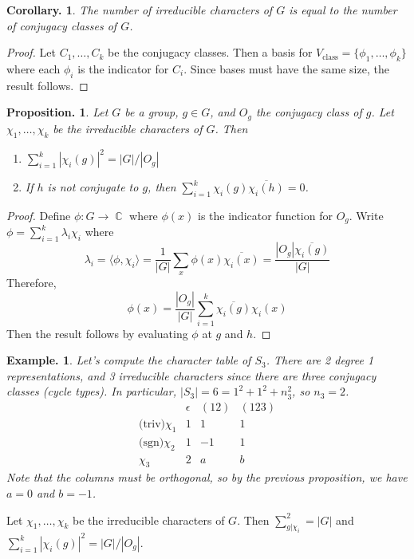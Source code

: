 \documentclass[11pt, a4paper]{memoir}
\DeclareMathOperator{\C}{{\mathbb{C}}}
\theoremstyle{change}
\newtheorem{corollary}[theorem]{Corollary.}
\newtheorem{proposition}[theorem]{Proposition.}
\theoremstyle{plain}
\theoremstyle{nonumberplain}
\newtheorem{example}{Example.}
\newtheorem{proof}{Proof}
\numberwithin{equation}{section}
\begin{document}
\begin{corollary}
    The number of irreducible characters of $G$ is equal to the number of conjugacy classes of $G$.
\end{corollary}
\begin{proof}
    Let $C_1,\ldots,C_k$ be the conjugacy classes.
    Then a basis for $V_{\text{class}}=\{\phi_1,\ldots,\phi_k\}$ where each $\phi_i$ is the indicator for $C_i$.
    Since bases must have the same size, the result follows.
\end{proof}
\begin{proposition}
    Let $G$ be a group, $g\in G$, and $O_g$ the conjugacy class of $g$.
    Let $\chi_1,\ldots,\chi_k$ be the irreducible characters of $G$.
    Then
    \begin{enumerate}[nl]
        \item $\sum_{i=1}^k|\chi_i(g)|^2=|G|/|O_g|$
        \item If $h$ is not conjugate to $g$, then $\sum_{i=1}^k\chi_i(g)\overline{\chi_i(h)}=0$.
    \end{enumerate}
\end{proposition}
\begin{proof}
    Define $\phi:G\to\C$ where $\phi(x)$ is the indicator function for $O_g$.
    Write $\phi=\sum_{i=1}^k \lambda_i\chi_i$ where
    \begin{equation*}
        \lambda_i=\langle\phi,\chi_i\rangle=\frac{1}{|G|}\sum_x\phi(x)\overline{\chi_i(x)}=\frac{|O_g|\overline{\chi_i(g)}}{|G|}
    \end{equation*}
    Therefore,
    \begin{equation*}
        \phi(x) = \frac{|O_g|}{|G|}\sum_{i=1}^k\overline{\chi_i(g)}\chi_i(x)
    \end{equation*}
    Then the result follows by evaluating $\phi$ at $g$ and $h$.
\end{proof}
\begin{example}
    Let's compute the character table of $S_3$.
    There are 2 degree 1 representations, and 3 irreducible characters since there are three conjugacy classes (cycle types).
    In particular, $|S_3|=6=1^2+1^2+n_3^2$, so $n_3=2$.
    \begin{equation*}
        \begin{array}{c|ccc}
            &\epsilon & (12) & (123)\\
            \text{(triv)}\chi_1 & 1&1&1\\
            \text{(sgn)}\chi_2 & 1&-1&1\\
            \chi_3 & 2 &a & b
        \end{array}
    \end{equation*}
    Note that the columns must be orthogonal, so by the previous proposition, we have $a=0$ and $b=-1$.
\end{example}
Let $\chi_1,\ldots,\chi_k$ be the irreducible characters of $G$.
Then $\sum_{g|\chi_i}^2=|G|$ and $\sum_{i=1}^k|\chi_i(g)|^2=|G|/|O_g|$.
\end{document}
